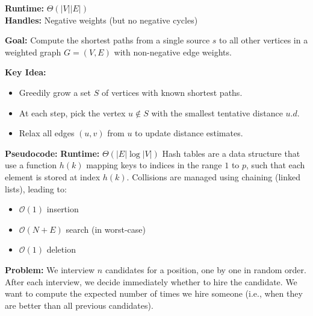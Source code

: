 \documentclass[a4paper,landscape]{article}
\newcommand{\bigo}{\mathcal{O}}
\begin{document}
\begin{multicols}{7}
\textbf{Runtime:} $\Theta(|V||E|)$ \\
\textbf{Handles:} Negative weights (but no negative cycles)
\endtcolorbox

\tcolorbox[mybox={Dijkstra’s Algorithm}]
\textbf{Goal:} Compute the shortest paths from a single source $s$ to all other vertices in a weighted graph $G = (V, E)$ with non-negative edge weights.

\textbf{Key Idea:}
\begin{itemize}[noitemsep, topsep=0pt]
    \item Greedily grow a set $S$ of vertices with known shortest paths.
    \item At each step, pick the vertex $u \notin S$ with the smallest tentative distance $u.d$.
    \item Relax all edges $(u, v)$ from $u$ to update distance estimates.
\end{itemize}
\textbf{Pseudocode:}
\textbf{Runtime:} $\Theta(|E| \log |V|)$
\endtcolorbox
\tcolorbox[mybox={HTable}]
Hash tables are a data structure that use a function $h(k)$ mapping keys to indices in the range $1$ to $p$, such that each element is stored at index $h(k)$.  
Collisions are managed using chaining (linked lists), leading to:
\begin{itemize}
  \item $\bigo(1)$ insertion
  \item $\bigo(N + E)$ search (in worst-case)
  \item $\bigo(1)$ deletion
\end{itemize}
\endtcolorbox

\tcolorbox[mybox={The Hiring Problem}]
\textbf{Problem:} We interview $n$ candidates for a position, one by one in random order. After each interview, we decide immediately whether to hire the candidate. We want to compute the expected number of times we hire someone (i.e., when they are better than all previous candidates).



\end{multicols}
\end{document}
